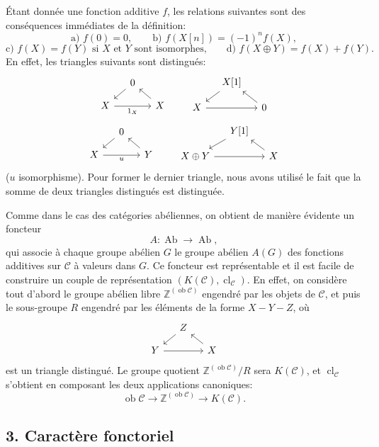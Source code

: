\documentclass[11pt]{article}
\providecommand{\Ob}{\operatorname{ob}}
\providecommand{\cC}{\mathcal C}
\providecommand{\Ob}{\operatorname{ob}}
\providecommand{\Ab}{\operatorname{Ab}}
\providecommand{\cC}{\mathcal C}
\providecommand{\Ab}{\operatorname{Ab}}
\providecommand{\Ob}{\operatorname{Ob}}
\providecommand{\Ob}{\operatorname{ob}}
\begin{document}
Étant donnée une fonction additive $f$, les relations suivantes sont des conséquences immédiates de la définition:
\[
\text{a) } f(0)=0,\qquad
\text{b) } f(X[n])=(-1)^n f(X),
\]
\[
\text{c) } f(X)=f(Y)\text{ si }X\text{ et }Y\text{ sont isomorphes,}
\qquad
\text{d) } f(X\oplus Y)=f(X)+f(Y).
\]
En effet, les triangles suivants sont distingués:
\[
\begin{tikzcd}[column sep=small,row sep=small]
&0 \arrow[dl]\\ X \arrow[rr,"1_X"']&&X\arrow[ul]
\end{tikzcd}
\qquad
\begin{tikzcd}[column sep=small,row sep=small]
&X[1]\arrow[dl]\\ X\arrow[rr]&&0\arrow[ul]
\end{tikzcd}
\]
\[
\begin{tikzcd}[column sep=small,row sep=small]
&0\arrow[dl]\\ X\arrow[rr,"u"']&&Y\arrow[ul]
\end{tikzcd}
\qquad
\begin{tikzcd}[column sep=small,row sep=small]
&Y[1]\arrow[dl]\\ X\oplus Y\arrow[rr]&&X\arrow[ul]
\end{tikzcd}
\]
($u$ isomorphisme). Pour former le dernier triangle, nous avons utilisé le fait que la somme de deux triangles distingués est distinguée.

Comme dans le cas des catégories abéliennes, on obtient de manière évidente un foncteur
\[
A:\Ab\longrightarrow\Ab,
\]
qui associe à chaque groupe abélien $G$ le groupe abélien $A(G)$ des fonctions additives sur $\cC$ à valeurs dans $G$. Ce foncteur est représentable et il est facile de construire un couple de représentation $(K(\cC),\operatorname{cl}_{\cC})$. En effet, on considère tout d'abord le groupe abélien libre $\mathbb Z^{(\Ob\cC)}$ engendré par les objets de $\cC$, et puis le sous-groupe $R$ engendré par les éléments de la forme $X-Y-Z$, où
\[
\begin{tikzcd}[column sep=small,row sep=small]
&Z\arrow[dl]\\ Y\arrow[rr]&&X\arrow[ul]
\end{tikzcd}
\]
est un triangle distingué. Le groupe quotient $\mathbb Z^{(\Ob\cC)}/R$ sera $K(\cC)$, et $\operatorname{cl}_{\cC}$ s'obtient en composant les deux applications canoniques:
\[
\Ob\cC\longrightarrow \mathbb Z^{(\Ob\cC)}\longrightarrow K(\cC).
\]

\subsection*{3. Caractère fonctoriel}
\end{document}
